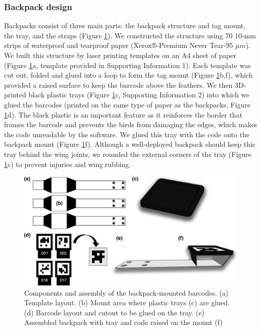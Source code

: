 \documentclass[11pt,a4paper,oneside]{book}
\begin{document}
\begin{doublespace}
\subsubsection{Backpack design}
Backpacks consist of three main parts: the backpack structure and tag mount, the tray, and the straps (Figure \ref{fig:bird_figure_1}). We constructed the structure using 70 10‐mm strips of waterproof and tearproof paper (Xerox®‐Premium Never Tear‐95 $\mu m$). We built this structure by laser printing templates on an A4 sheet of paper (Figure \ref{fig:bird_figure_1}a, template provided in Supporting Information 1). Each template was cut out, folded and glued into a loop to form the tag mount (Figure \ref{fig:bird_figure_1}b,f), which provided a raised surface to keep the barcode above the feathers. We then 3D‐printed black plastic trays (Figure \ref{fig:bird_figure_1}c, Supporting Information 2) into which we glued the barcodes (printed on the same type of paper as the backpacks, Figure \ref{fig:bird_figure_1}d). The black plastic is an important feature as it reinforces the border that frames the barcode and prevents the birds from damaging the edges, which makes the code unreadable by the software. We glued this tray with the code onto the backpack mount (Figure \ref{fig:bird_figure_1}f). Although a well‐deployed backpack should keep this tray behind the wing joints, we rounded the external corners of the tray (Figure \ref{fig:bird_figure_1}c) to prevent injuries and wing rubbing.

\begin{figure}[!htb]
    \centering
    \includegraphics{Graving_IMPRS_Thesis/figures/bird_figure_1.jpg}
    \caption{Components and assembly of the backpack‐mounted barcodes. (a) Template layout. (b) Mount area where plastic trays (c) are glued. (d) Barcode layout and cutout to be glued on the tray. (e) Assembled backpack with tray and code raised on the mount (f)}
    \label{fig:bird_figure_1}
\end{figure}



\end{doublespace}
\end{document}
